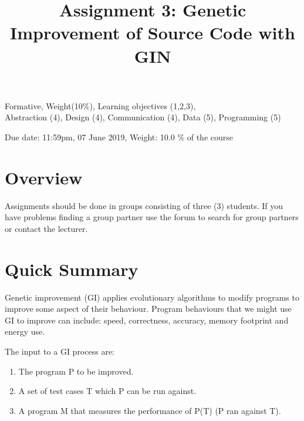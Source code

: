 \documentclass{pracs}
\newcommand{\duedate}{07 June 2019}
\begin{document}
\title{Assignment 3: Genetic Improvement of Source Code with GIN}
\maketitle
\thispagestyle{fancy}


	Formative, 	Weight(10\%), 	Learning objectives (1,2,3),\\
 	Abstraction (4), 	Design (4), 	Communication (4), 	Data (5),	Programming (5)


\noindent 

 \begin{center}
    Due date: 11:59pm, \duedate, Weight: 10.0 \% of the course
  \end{center}



\section{Overview}
Assignments should be done in groups consisting of three (3) students.  If you have problems finding a group partner use the forum to search for group partners or contact the lecturer.



\section*{Quick Summary}

Genetic improvement (GI) applies evolutionary algorithms to modify programs to improve some aspect of their behaviour. Program behaviours that we might use GI to improve can include: speed, correctness, accuracy, memory footprint and energy use. 

The input to a GI process are:

\begin{enumerate}
\item The program P to be improved.
\item A set of test cases T which P can be run against.
\item A program M that measures the performance of P(T) (P ran against T).
\end{enumerate}
\end{document}

